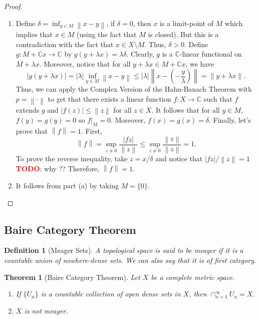 \documentclass{article}
\newtheorem*{theorem}{Theorem}
\newtheorem*{definition}{Definition}
\newcommand{\C}{\mathbb{C}}
\newcommand{\norm}[1]{\left\lVert#1 \right\rVert}
\newcommand{\abs}[1]{\left\lvert#1 \right\rvert}
\newcommand{\td}{\textcolor{red}{\textbf{TODO}}}
\begin{document}
\begin{proof}
    \begin{enumerate}[label=(\alph*)]
        \item Define $\delta = \inf_{y\in M}\norm{x - y}$, if $\delta = 0$, then $x$ is a limit-point of $M$ which implies that $x \in M$ (using the fact that $M$ is closed). But this is a contradiction with the fact that $x \in X\setminus M$. Thus, $\delta > 0$. Define $g : M + \C x \to \C$ by $g(y+\lambda x) = \lambda \delta$. Clearly, $g$ is a $\C$-linear functional on $M + \lambda x$. Moreover, notice that for all $y + \lambda x \in M + \C x$, we have
        $$|g(y + \lambda x)| = |\lambda|\inf_{y\in M}\norm{x - y} \leq |\lambda| \norm{x - \left(-\frac{y}{\lambda}\right)} = \norm{y + \lambda x}.$$
        Thus, we can apply the Complex Version of the Hahn-Banach Theorem with $p = \norm{\cdot}$ to get that there exists a linear function $f : X \to \C$ such that $f$ extends $g$ and $|f(z)| \leq \norm{z}$ for all $z \in X$. It follows that for all $y \in M$, $f(y) = g(y) = 0$ so $f|_M = 0$. Moreover, $f(x) = g(x) = \delta$. Finally, let's prove that $\norm{f} = 1$. First,
        $$\norm{f} = \sup_{z \neq 0}\frac{\abs{fz}}{\norm{z}} \leq \sup_{z \neq 0}\frac{\norm{z}}{\norm{z}} = 1.$$
        To prove the reverse inequality, take $z = x/\delta$ and notice that $|fz|/\norm{z} = 1$ \td : why ?? Therefore, $\norm{f} = 1$.
        \item It follows from part (a) by taking $M = \{0\}$.
    \end{enumerate}
\end{proof}

\subsection{Baire Category Theorem}

\begin{definition}[Meager Sets]
    A topological space is said to be meager if it is a countable union of nowhere-dense sets. We can also say that it is of first category.
\end{definition}

\begin{theorem}[Baire Category Theorem]
    Let $X$ be a complete metric space.
    \begin{enumerate}[label=(\alph*)]
        \item If $\{U_n\}$ is a countable collection of open dense sets in $X$, then $\overline{\cap_{n=1}^{\infty}U_n} = X$.
        \item $X$ is not meager.
    \end{enumerate}
\end{theorem}
\end{document}
